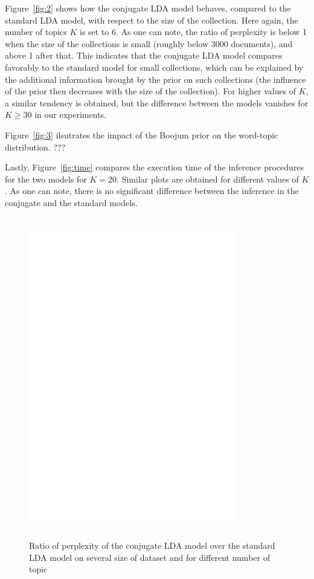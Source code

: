 Figure~\ref{fig:2} shows how the conjugate LDA model behaves, compared to the standard LDA model, with respect to the size of the collection. Here again, the number of topics $K$ is set to 6. As one can note, the ratio of perplexity is below 1 when the size of the collections is small (roughly below 3000 documents), and above 1 after that. This indicates that the conjugate LDA model compares favorably to the standard model for small collections, which can be explained by the additional information brought by the prior on such collections (the influence of the prior then decreases with the size of the collection). For higher values of $K$, a similar tendency is obtained, but the difference between the models vanishes for $K \ge 30$ in our experiments.

Figure~\ref{fig:3} ilsutrates the impact of the Boojum prior on the word-topic distribution. ???

Lastly, Figure~\ref{fig:time} compares the execution time of the inference procedures for the two models for $K=20$. Similar plots are obtained for different values of $K$. As one can note, there is no significant difference between the inference in the conjugate and the standard models.

\begin{figure}[h]
\label{fig:pp_D}
\includegraphics[width=9cm, height=14cm]{results/pp_D.eps}
\caption{Ratio of perplexity of the conjugate LDA model over the standard LDA model on several size of dataset and for different number of topic}
\end{figure}

